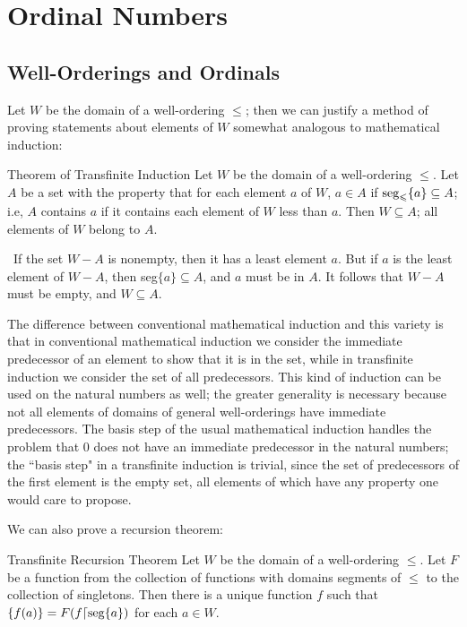 \chapter{Ordinal Numbers}


\section{Well-Orderings and Ordinals}

Let $W$ be the domain of a well-ordering $\leq$; then we can
justify a method of proving statements about elements of $W$ somewhat analogous
to mathematical induction:

\begin{Thm}{Theorem of Transfinite
Induction}
  Let $W$ be the domain of a
  well-order\-ing $\leq$.  Let $A$ be a set with the property that for each
  element $a$ of $W$, $a \in A$ if $\seg_{\leq}\{a\}\index{segment} \subseteq
  A$; i.e, $A$ contains $a$ if it
  contains each element of $W$ less than $a$.  Then $W \subseteq A$; all
  elements of $W$ belong to $A$.
\end{Thm}

\preuve\ If the set $W - A$ is nonempty, then it has a least element $a$.
But if $a$ is the least element of $W - A$, then seg$\{a\} \subseteq A$, and
$a$ must be in $A$.  It follows that $W - A$ must be empty, and $W \subseteq
A$.
\finpreuve

The difference between conventional mathematical
induction and 
this variety is that in conventional mathematical induction we
consider the immediate predecessor of an element to show that it is in
the set, while in transfinite induction we consider the set of all
predecessors.  This kind of induction can be used on the natural numbers as well; the greater generality is necessary because not all
elements of domains of general
well-orderings have immediate 
predecessors.  The basis step of the usual mathematical induction
handles the problem that 0 does not have an immediate predecessor in
the natural numbers; the ``basis step" in a transfinite induction is
trivial, since the set of predecessors of the first element is the
empty set, all elements of which have any
property one would care to 
propose.

We can also prove a recursion theorem:
\begin{Thm}{Transfinite Recursion Theorem}
 Let $W$ be the domain of a well-ordering
 $\leq$.  Let $F$ be a function from the collection of
 functions with domains segments of $\leq$ to the collection of
 singletons.  Then there is a unique function $f$ such that
 $\{f(a)\} = F(f \lceil  \mathop{\mathrm{seg}}\{a\})$ for each $a \in W$.
\end{Thm}


